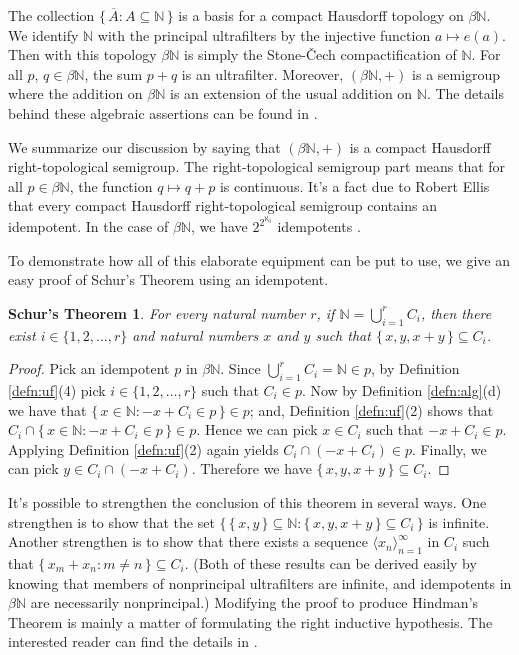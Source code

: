 \documentclass[12pt]{article}
\theoremstyle{plain}
\newtheorem{schur}[thm]{Schur's Theorem}
\theoremstyle{definition}
\newcommand{\bbN}{\mathbb{N}}
\newcommand{\la}{\langle}
\newcommand{\ra}{\rangle}
\begin{document}
The collection $\{\, \overline{A} : A \subseteq \bbN \,\}$ is a
basis for a compact Hausdorff topology on $\beta\bbN$.
We identify $\bbN$ with the principal ultrafilters by the injective
function $a \mapsto e(a)$. 
Then with this topology $\beta\bbN$ is simply the Stone-\v{C}ech
compactification of $\bbN$. 
For all $p$, $q \in \beta\bbN$, the sum $p+q$ is an ultrafilter.
Moreover, $(\beta\bbN, +)$ is a semigroup where the addition on
$\beta\bbN$ is an extension of the usual addition on $\bbN$. 
The details behind these algebraic assertions can be found in
\cite[Chapter 4 Section 1]{Hindman:1998fk}.

We summarize our discussion by saying that $(\beta\bbN,
+)$ is a compact Hausdorff right-topological semigroup. 
The right-topological semigroup part means that for all $p \in
\beta\bbN$, the function $q \mapsto q+p$ is continuous.
It's a fact due to Robert Ellis \cite[Corollary 2.10]{Ellis:1969zr}
that every compact Hausdorff right-topological semigroup contains an
idempotent. 
In the case of $\beta\bbN$, we have 
$2^{2^{\aleph_0}}$ idempotents \cite[Theorem 6.44]{Hindman:1998fk}. 

To demonstrate how all of this elaborate equipment can be put to use,
we give an easy proof of Schur's Theorem using an idempotent.
\begin{schur}
  For every natural number $r$, if  \/ $\bbN = \bigcup_{i=1}^r C_i$,
  then there exist $i \in \{1, 2, \ldots, r\}$ and natural numbers
  $x$ and $y$ such that $\{\, x, y, x+y \,\} \subseteq C_i$.
\end{schur}
\begin{proof}
  Pick an idempotent $p$ in $\beta\bbN$.
  Since $\bigcup_{i=1}^r C_i = \bbN \in p$, by Definition
  \ref{defn:uf}(4) pick $i \in \{1, 2, \ldots, r\}$ such that $C_i \in
  p$.
  Now by Definition \ref{defn:alg}(d) we have that $\{\, x \in \bbN :
  -x + C_i \in p \,\} \in p$; and, Definition \ref{defn:uf}(2) shows
  that $C_i \cap \{\, x \in \bbN : -x + C_i \in p \,\} \in p$.
  Hence we can pick $x \in C_i$ such that $-x + C_i \in p$. 
  Applying Definition \ref{defn:uf}(2) again yields $C_i \cap (-x +
  C_i) \in p$.
  Finally, we can pick $y \in C_i \cap (-x+C_i)$.
  Therefore we have $\{\, x, y, x+y \,\} \subseteq C_i$.
\end{proof}

It's possible to strengthen the conclusion of this theorem in several
ways.
One strengthen is to show that the set $\bigl\{\,\{\, x, y \,\}
\subseteq \bbN : \{\,x,y,x+y\,\} \subseteq C_i \,\bigr\}$ is infinite.
Another strengthen is to show that there exists a sequence $\la x_n
\ra_{n=1}^\infty$ in $C_i$ such that $\{\, x_m + x_n : m \ne n \,\}
\subseteq C_i$.
(Both of these results can be derived easily by knowing that members
of nonprincipal ultrafilters are infinite, and idempotents in
$\beta\bbN$ are necessarily nonprincipal.)
Modifying the proof to produce Hindman's Theorem is mainly a matter of
formulating the right inductive hypothesis.
The interested reader can find the details in \cite[Theorem
5.8]{Hindman:1998fk}. 
\end{document}
